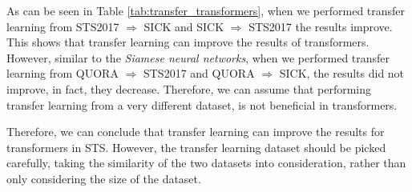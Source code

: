 \begin{table}[htb]
	\centering
	\caption[Results for transfer learning with Transformers]{Results for transfer learning with different Transformers. For each transfer learning experiment we show the difference between with and without transfer learning. Non-grey values are the results of the experiments without transfer learning which we showed in the previous section. For ease of visualisation we only report the Pearson correlation ($\bm{\rho}$).}  
	\label{tab:transfer_transformers}
\end{table}

As can be seen in Table \ref{tab:transfer_transformers}, when we performed transfer learning from STS2017 $\Rightarrow$ SICK and SICK $\Rightarrow$ STS2017 the results improve. This shows that transfer learning can improve the results of transformers. However, similar to the \textit{Siamese neural networks}, when we performed transfer learning from QUORA $\Rightarrow$ STS2017 and QUORA $\Rightarrow$ SICK, the results did not improve, in fact, they decrease. Therefore, we can assume that performing transfer learning from a very different dataset, is not beneficial in transformers. 

Therefore, we can conclude that transfer learning can improve the results for transformers in STS. However, the transfer learning dataset should be picked carefully, taking the similarity of the two datasets into consideration, rather than only considering the size of the dataset.


